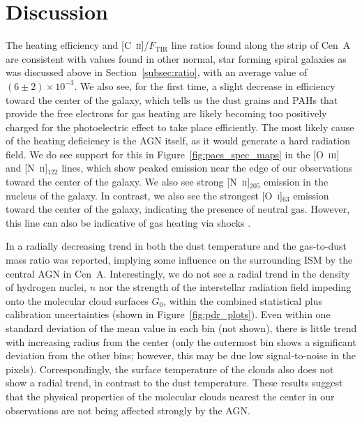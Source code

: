 \documentclass[preprint2]{aastex}
\begin{document}
\section{Discussion}\label{discussion}
The heating efficiency and [C~\textsc{ii}]/$F_{\mathrm{TIR}}$ line ratios found along the strip of Cen~A are consistent with values found in other normal, star forming spiral galaxies as was discussed above in Section~\ref{subsec:ratio}, with an average value of $(6 \pm 2) \times 10^{-3}$.  We also see, for the first time, a slight decrease in efficiency toward the center of the galaxy, which tells us the dust grains and PAHs that provide the free electrons for gas heating are likely becoming too positively charged for the photoelectric effect to take place efficiently.  The most likely cause of the heating deficiency is the AGN itself, as it would generate a hard radiation field.  We do see support for this in Figure~\ref{fig:pacs_spec_maps} in the [O~\textsc{iii}] and [N~\textsc{ii}]$_{122}$ lines, which show peaked emission near the edge of our observations toward the center of the galaxy.  We also see strong [N~\textsc{ii}]$_{205}$ emission in the nucleus of the galaxy.  In contrast, we also see the strongest [O~\textsc{i}]$_{63}$ emission toward the center of the galaxy, indicating the presence of neutral gas.  However, this line can also be indicative of gas heating via shocks \citep{1989ApJ...342..306H}.

In \citet{2012MNRAS.422.2291P} a radially decreasing trend in both the dust temperature and the gas-to-dust mass ratio was reported, implying some influence on the surrounding ISM by the central AGN in Cen~A.  Interestingly, we do not see a radial trend in the density of hydrogen nuclei, $n$ nor the strength of the interstellar radiation field impeding onto the molecular cloud surfaces $G_{0}$, within the combined statistical plus calibration uncertainties (shown in Figure~\ref{fig:pdr_plots}).  Even within one standard deviation of the mean value in each bin (not shown), there is little trend with increasing radius from the center (only the outermost bin shows a significant deviation from the other bins; however, this may be due low signal-to-noise in the pixels).  Correspondingly, the surface temperature of the clouds also does not show a radial trend, in contrast to the dust temperature.  These results suggest that the physical properties of the molecular clouds nearest the center in our observations are not being affected strongly by the AGN.
\end{document}
